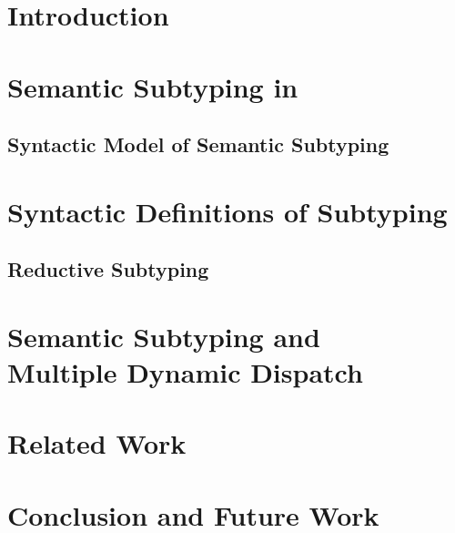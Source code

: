 \documentclass[sigplan,review]{acmart}\settopmatter{printfolios=true,printccs=false,printacmref=false}
\begin{document}
\section{Introduction}\label{sec:intro}




\section{Semantic Subtyping in \BetaJulia}\label{sec:semsub}



\subsection{Syntactic Model of Semantic Subtyping}
\label{sec:syn-model-of-semsub}




\section{Syntactic Definitions of Subtyping}\label{sec:synsub}



\subsection{Reductive Subtyping}




\section{Semantic Subtyping and\\ Multiple Dynamic Dispatch}
\label{sec:discussion}




\section{Related Work}




\section{Conclusion and Future Work}


\end{document}
